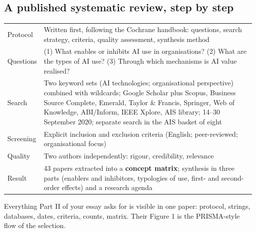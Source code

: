 \documentclass[11pt,a4paper,british,twoside=false,headings=small,chapterprefix=false,numbers=noenddot]{scrbook}
\begin{document}
\subsection{A published systematic review, step by step}
\begin{center}\small
\footnotesize
  \renewcommand{\arraystretch}{1.15}
  \begin{tabular}{@{}p{2.4cm}p{10.9cm}@{}}
    \toprule
    Protocol & Written first, following the Cochrane handbook: questions, search strategy, criteria, quality assessment, synthesis method\\
    Questions & (1) What enables or inhibits AI use in organisations? (2) What are the types of AI use? (3) Through which mechanisms is AI value realised?\\
    Search & Two keyword sets (AI technologies; organisational perspective) combined with wildcards; Google Scholar plus Scopus, Business Source Complete, Emerald, Taylor \& Francis, Springer, Web of Knowledge, ABI/Inform, IEEE Xplore, AIS library; 14--30 September 2020; separate search in the AIS basket of eight\\
    Screening & Explicit inclusion and exclusion criteria (English; peer-reviewed; organisational focus)\\
    Quality & Two authors independently: rigour, credibility, relevance\\
    Result & 43 papers extracted into a \textbf{concept matrix}; synthesis in three parts (enablers and inhibitors, typologies of use, first- and second-order effects) and a research agenda\\
    \bottomrule
  \end{tabular}
  

  \small Everything Part II of your essay asks for is visible in one paper:
  protocol, strings, databases, dates, criteria, counts, matrix. Their Figure 1
  is the PRISMA-style flow of the selection.
\end{center}
\end{document}
